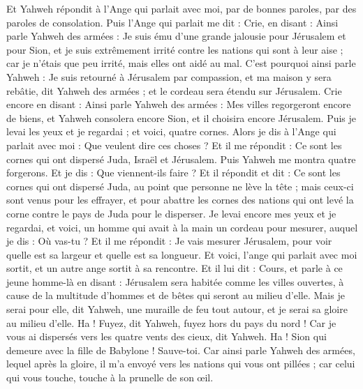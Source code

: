 \begin{multicols}{2}
Et Yahweh répondit à l'Ange qui parlait avec moi, par de bonnes paroles, par des paroles de consolation.
Puis l'Ange qui parlait me dit : Crie, en disant : Ainsi parle Yahweh des armées : Je suis ému d'une grande jalousie pour Jérusalem et pour Sion,
et je suis extrêmement irrité contre les nations qui sont à leur aise ; car je n'étais que peu irrité, mais elles ont aidé au mal.
C'est pourquoi ainsi parle Yahweh : Je suis retourné à Jérusalem par compassion, et ma maison y sera rebâtie, dit Yahweh des armées ; et le cordeau sera étendu sur Jérusalem.
Crie encore en disant : Ainsi parle Yahweh des armées : Mes villes regorgeront encore de biens, et Yahweh consolera encore Sion, et il choisira encore Jérusalem.
Puis je levai les yeux et je regardai ; et voici, quatre cornes.
Alors je dis à l'Ange qui parlait avec moi : Que veulent dire ces choses ? Et il me répondit : Ce sont les cornes qui ont dispersé Juda, Israël et Jérusalem.
Puis Yahweh me montra quatre forgerons.
Et je dis : Que viennent-ils faire ? Et il répondit et dit : Ce sont les cornes qui ont dispersé Juda, au point que personne ne lève la tête ; mais ceux-ci sont venus pour les effrayer, et pour abattre les cornes des nations qui ont levé la corne contre le pays de Juda pour le disperser.
\VerseOne{}Je levai encore mes yeux et je regardai, et voici, un homme qui avait à la main un cordeau pour mesurer,
auquel je dis : Où vas-tu ? Et il me répondit : Je vais mesurer Jérusalem, pour voir quelle est sa largeur et quelle est sa longueur.
Et voici, l'ange qui parlait avec moi sortit, et un autre ange sortit à sa rencontre.
Et il lui dit : Cours, et parle à ce jeune homme-là en disant : Jérusalem sera habitée comme les villes ouvertes, à cause de la multitude d'hommes et de bêtes qui seront au milieu d'elle.
Mais je serai pour elle, dit Yahweh, une muraille de feu tout autour, et je serai sa gloire au milieu d'elle.
Ha ! Fuyez, dit Yahweh, fuyez hors du pays du nord ! Car je vous ai dispersés vers les quatre vents des cieux, dit Yahweh.
Ha ! Sion qui demeure avec la fille de Babylone ! Sauve-toi.
Car ainsi parle Yahweh des armées, lequel après la gloire, il m'a envoyé vers les nations qui vous ont pillées ; car celui qui vous touche, touche à la prunelle de son œil.

\end{multicols}
